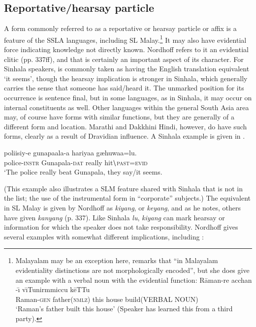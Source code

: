 \subsection{Reportative/hearsay particle }\label{gair:sec:3.9}
 A form commonly referred to as a reportative or hearsay particle or affix is a feature of the SSLA languages, including SL Malay.\footnote{Malayalam
  may be an exception here, \citet[14]{Bashir2006} remarks that ``in Malayalam evidentiality distinctions are not morphologically encoded'', but she does give an example with a verbal noun with the evidential function:
  \ea
   \gll R{\={a}}man-re acchan -{\={\i}} v{\={\i}}Tunirmmiccu k{\={e}}TTu\\
    Raman-\textsc{gen} father(\textsc{nmlz}) this house build(VERBAL NOUN)\\
    `Raman's father built this house' (Speaker has learned this from a third party).
    \z
} 
It may also have evidential force indicating knowledge not directly known. Nordhoff refers to it an evidential clitic  (pp. 337ff), and that is certainly an important aspect of its character. For Sinhala speakers, is commonly taken as having the English translation equivalent `it seems', though the hearsay implication is stronger in Sinhala, which generally carries the sense that someone has said/heard it. The unmarked position for its occurrence is sentence final, but in some languages, as in Sinhala, it may occur on internal constituents as well. Other languages within the general South Asia area may, of course have forms with similar functions, but they are generally of a different form and location. Marathi and Dakkhini Hindi, however, do have such forms, clearly as a result of Dravidian influence. A Sinhala example is given in .


\ea\label{ex3.9.1} 
\gll poliisiy-e{\ng} gunapaala-{\dott}a hariya{\dott}a g{\ae}huwaa=lu.\\
   police-\textsc{instr}  Gunapala-\textsc{dat} really hit$\backslash$\textsc{past}=\textsc{evid}\\
  `The police really beat Gunapala, they say/it seems.\\ 
\z

(This example also illustrates a SLM feature shared with Sinhala that is not in the list; the use of the instrumental form in ``corporate'' subjects.)
 The equivalent in SL Malay is given by Nordhoff as \textit{kiyang}, or \textit{keyang}, and as he notes, others have given \textit{kanyang} (p. 337).
  Like Sinhala \textit{lu}, \textit{kiyang} can mark hearsay or information for which the speaker does not take responsibility. Nordhoff gives several examples with somewhat different implications, including :


